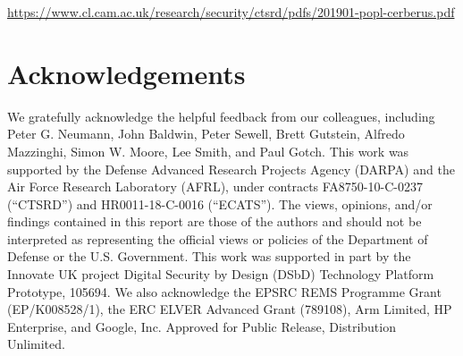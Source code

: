 \documentclass[12pt,twoside,openright,a4paper]{article}
\begin{document}
\smallskip
\noindent
\url{https://www.cl.cam.ac.uk/research/security/ctsrd/pdfs/201901-popl-cerberus.pdf}
\smallskip


\section{Acknowledgements}

We gratefully acknowledge the helpful feedback from our colleagues, including
Peter G. Neumann, John Baldwin, Peter Sewell, Brett
Gutstein, Alfredo Mazzinghi, Simon W. Moore, Lee Smith, and Paul Gotch.
This work was supported by the Defense Advanced Research Projects Agency (DARPA) and the Air Force Research Laboratory (AFRL), under contracts
FA8750-10-C-0237 (``CTSRD'') and HR0011-18-C-0016 (``ECATS'').
The views, opinions, and/or findings contained in this report are those of the authors and should not be interpreted as representing the official views or policies of the Department of Defense or the U.S. Government.
This work was supported in part by the Innovate UK project Digital Security by
Design (DSbD) Technology Platform Prototype, 105694.
We also acknowledge the EPSRC REMS Programme Grant (EP/K008528/1), the
ERC ELVER Advanced Grant (789108), Arm Limited,
HP Enterprise, and Google, Inc.
Approved for Public Release, Distribution Unlimited.

\printbibliography
\end{document}
